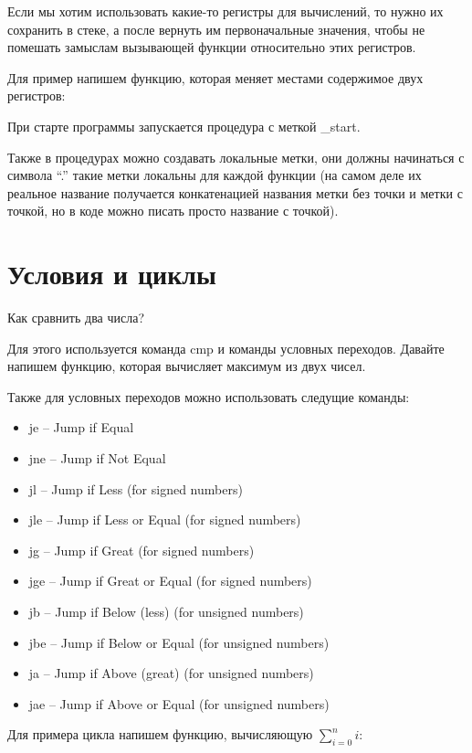 \documentclass[a4paper,12pt]{article}
\begin{document}
Если мы хотим использовать какие-то регистры для вычислений, то нужно
их сохранить в стеке, а после вернуть им первоначальные значения,
чтобы не помешать замыслам вызывающей функции относительно этих
регистров.

Для пример напишем функцию, которая меняет местами содержимое двух
регистров:



При старте программы запускается процедура с меткой \_start.

Также в процедурах можно создавать локальные метки, они должны
начинаться с символа ``.'' такие метки локальны для каждой функции (на
самом деле их реальное название получается конкатенацией названия
метки без точки и метки с точкой, но в коде можно писать просто
название с точкой).

\section{Условия и циклы}

Как сравнить два числа?

Для этого используется команда cmp и команды условных переходов.
Давайте напишем функцию, которая вычисляет максимум из двух чисел.



Также для условных переходов можно использовать следущие команды:
\begin{itemize}
  \item je -- Jump if Equal
  \item jne -- Jump if Not Equal
  \item jl -- Jump if Less (for signed numbers)
  \item jle -- Jump if Less or Equal (for signed numbers)
  \item jg -- Jump if Great (for signed numbers)
  \item jge -- Jump if Great or Equal (for signed numbers)
  \item jb -- Jump if Below (less) (for unsigned numbers)
  \item jbe -- Jump if Below or Equal (for unsigned numbers)
  \item ja -- Jump if Above (great) (for unsigned numbers)
  \item jae -- Jump if Above or Equal (for unsigned numbers)
\end{itemize}

Для примера цикла напишем функцию, вычисляющую $ \sum\limits_{i=0}^n i $:
\end{document}
